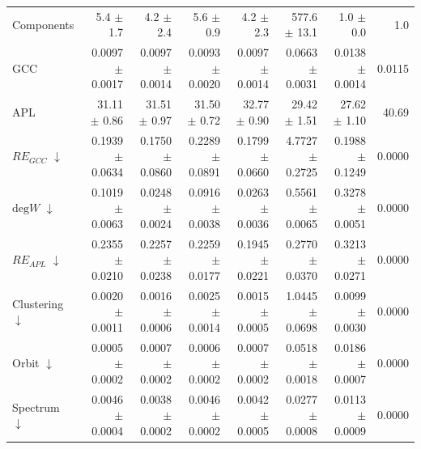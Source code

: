 \begin{table}[H]
\begin{tabular}{lrrrrrrr}
Components                    & 5.4 $\pm$ 1.7 & 4.2 $\pm$ 2.4 & 5.6 $\pm$ 0.9 & 4.2 $\pm$ 2.3 & 577.6 $\pm$ 13.1 & 1.0 $\pm$ 0.0 & 1.0 \\
GCC                           & 0.0097 $\pm$ 0.0017 & 0.0097 $\pm$ 0.0014 & 0.0093 $\pm$ 0.0020 & 0.0097 $\pm$ 0.0014 & 0.0663 $\pm$ 0.0031 & 0.0138 $\pm$ 0.0014 & 0.0115 \\
APL                           & 31.11 $\pm$ 0.86 & 31.51 $\pm$ 0.97 & 31.50 $\pm$ 0.72 & 32.77 $\pm$ 0.90 & 29.42 $\pm$ 1.51 & 27.62 $\pm$ 1.10 & 40.69 \\
\midrule
$RE_{GCC}$ $\downarrow$       & 0.1939 $\pm$ 0.0634 & 0.1750 $\pm$ 0.0860 & 0.2289 $\pm$ 0.0891 & 0.1799 $\pm$ 0.0660 & 4.7727 $\pm$ 0.2725 & 0.1988 $\pm$ 0.1249 & 0.0000 \\
$\mathrm{deg}W$ $\downarrow$  & 0.1019 $\pm$ 0.0063 & 0.0248 $\pm$ 0.0024 & 0.0916 $\pm$ 0.0038 & 0.0263 $\pm$ 0.0036 & 0.5561 $\pm$ 0.0065 & 0.3278 $\pm$ 0.0051 & 0.0000 \\
$RE_{APL}$ $\downarrow$       & 0.2355 $\pm$ 0.0210 & 0.2257 $\pm$ 0.0238 & 0.2259 $\pm$ 0.0177 & 0.1945 $\pm$ 0.0221 & 0.2770 $\pm$ 0.0370 & 0.3213 $\pm$ 0.0271 & 0.0000 \\
Clustering $\downarrow$       & 0.0020 $\pm$ 0.0011 & 0.0016 $\pm$ 0.0006 & 0.0025 $\pm$ 0.0014 & 0.0015 $\pm$ 0.0005 & 1.0445 $\pm$ 0.0698 & 0.0099 $\pm$ 0.0030 & 0.0000 \\
Orbit $\downarrow$            & 0.0005 $\pm$ 0.0002 & 0.0007 $\pm$ 0.0002 & 0.0006 $\pm$ 0.0002 & 0.0007 $\pm$ 0.0002 & 0.0518 $\pm$ 0.0018 & 0.0186 $\pm$ 0.0007 & 0.0000 \\
Spectrum $\downarrow$         & 0.0046 $\pm$ 0.0004 & 0.0038 $\pm$ 0.0002 & 0.0046 $\pm$ 0.0002 & 0.0042 $\pm$ 0.0005 & 0.0277 $\pm$ 0.0008 & 0.0113 $\pm$ 0.0009 & 0.0000 \\
\bottomrule
\end{tabular}
\end{table}
